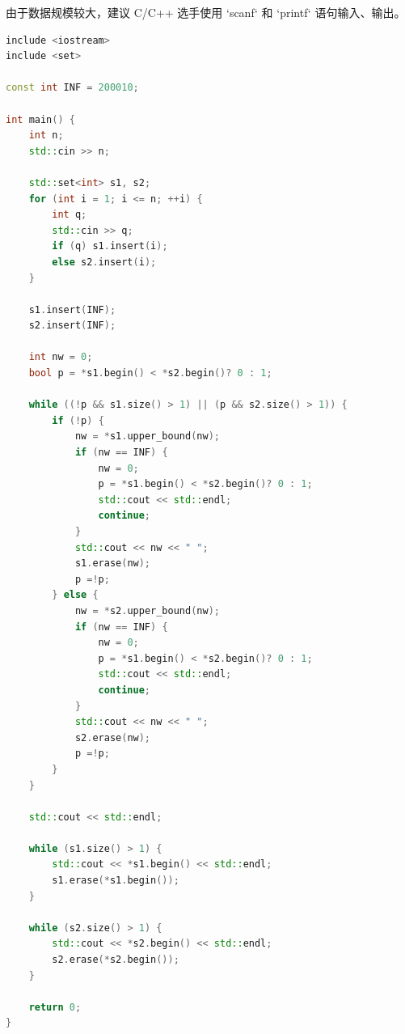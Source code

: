 \documentclass[12pt,twiside,a4paper]{ctexbook}
\numberwithin{chapter}{part}
\begin{document}
由于数据规模较大，建议 C/C++ 选手使用 `scanf` 和 `printf` 语句输入、输出。
\begin{lstlisting}[language=c++,breaklines=true]
include <iostream>
include <set>

const int INF = 200010;

int main() {
    int n;
    std::cin >> n;

    std::set<int> s1, s2;
    for (int i = 1; i <= n; ++i) {
        int q;
        std::cin >> q;
        if (q) s1.insert(i);
        else s2.insert(i);
    }

    s1.insert(INF);
    s2.insert(INF);

    int nw = 0;
    bool p = *s1.begin() < *s2.begin()? 0 : 1;

    while ((!p && s1.size() > 1) || (p && s2.size() > 1)) {
        if (!p) {
            nw = *s1.upper_bound(nw);
            if (nw == INF) {
                nw = 0;
                p = *s1.begin() < *s2.begin()? 0 : 1;
                std::cout << std::endl;
                continue;
            }
            std::cout << nw << " ";
            s1.erase(nw);
            p =!p;
        } else {
            nw = *s2.upper_bound(nw);
            if (nw == INF) {
                nw = 0;
                p = *s1.begin() < *s2.begin()? 0 : 1;
                std::cout << std::endl;
                continue;
            }
            std::cout << nw << " ";
            s2.erase(nw);
            p =!p;
        }
    }

    std::cout << std::endl;

    while (s1.size() > 1) {
        std::cout << *s1.begin() << std::endl;
        s1.erase(*s1.begin());
    }

    while (s2.size() > 1) {
        std::cout << *s2.begin() << std::endl;
        s2.erase(*s2.begin());
    }

    return 0;
}
\end{lstlisting}

\begin{lstlisting}[language=c++,breaklines=true]

\end{lstlisting}

\section{}
\begin{lstlisting}[language=c++,breaklines=true]

\end{lstlisting}
\end{document}
